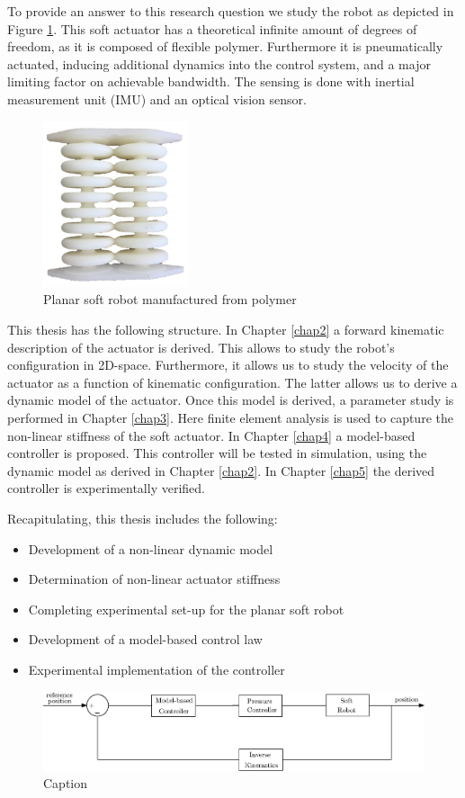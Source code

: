To provide an answer to this research question we study the robot as depicted in Figure \ref{fig1:actuator}. This soft actuator has a theoretical infinite amount of degrees of freedom, as it is composed of flexible polymer. Furthermore it is pneumatically actuated, inducing additional dynamics into the control system, and a major limiting factor on achievable bandwidth. The sensing is done with inertial measurement unit (IMU) and an optical vision sensor. 

\begin{figure}[H]
    \centering
    \includegraphics[width = 
   0.38\textwidth]{Figures/Chapter1/actuator.png}
    \caption{Planar soft robot manufactured from polymer}
    \label{fig1:actuator}
\end{figure}

This thesis has the following structure. In Chapter \ref{chap2} a forward kinematic description of the actuator is derived. This allows to study the robot's configuration in 2D-space. Furthermore, it allows us to study the velocity of the actuator as a function of kinematic configuration. The latter allows us to derive a dynamic model of the actuator. Once this model is derived, a parameter study is performed in Chapter \ref{chap3}. Here finite element analysis is used to capture the non-linear stiffness of the soft actuator. In Chapter \ref{chap4} a model-based controller 
is proposed. This controller will be tested in simulation, using the dynamic model as derived in Chapter \ref{chap2}. In Chapter \ref{chap5} the derived controller is experimentally verified. 

Recapitulating, this thesis includes the following:


\begin{itemize}
    \item Development of a non-linear dynamic model
    \item Determination of non-linear actuator stiffness
    \item Completing experimental set-up for the planar soft robot 
    \item Development of a model-based control law
    \item Experimental implementation of the controller
\end{itemize}

\begin{figure}[H]
    \centering
    \includegraphics[width = \textwidth]{Figures/Chapter1/controlscheme.eps}
    \caption{Caption}
    \label{fig:my_label}
\end{figure}